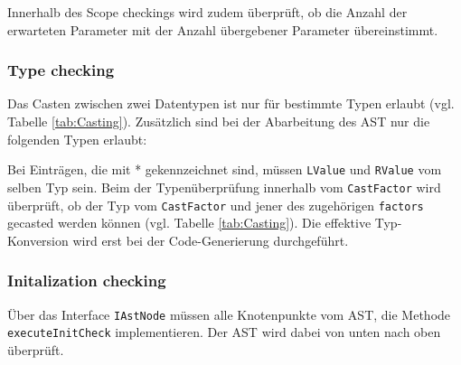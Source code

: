 \documentclass[10pt, a4paper, twocolumn]{article} %
\begin{document}
Innerhalb des Scope checkings wird zudem überprüft, ob die Anzahl der erwarteten Parameter mit der Anzahl übergebener Parameter übereinstimmt.

\subsubsection*{Type checking}
Das Casten zwischen zwei Datentypen ist nur für bestimmte Typen erlaubt (vgl. Tabelle \ref{tab:Casting}).
Zusätzlich sind bei der Abarbeitung des AST nur die folgenden Typen erlaubt:

\begin{table}[h]
    \centering
    \tiny
    \caption{Erlaubte Typen}
    \label{tab:types}
\end{table}
Bei Einträgen, die mit * gekennzeichnet sind, müssen \texttt{LValue} und \texttt{RValue} vom selben Typ sein.
Beim der Typenüberprüfung innerhalb vom \texttt{CastFactor} wird überprüft, ob der Typ vom \texttt{CastFactor} und jener des zugehörigen \texttt{factors} gecasted werden können (vgl. Tabelle \ref{tab:Casting}).
Die effektive Typ-Konversion wird erst bei der Code-Generierung durchgeführt.

\subsubsection*{Initalization checking}
Über das Interface \texttt{IAstNode} müssen alle Knotenpunkte vom AST, die Methode \texttt{executeInitCheck} implementieren.
Der AST wird dabei von unten nach oben überprüft.
\end{document}
